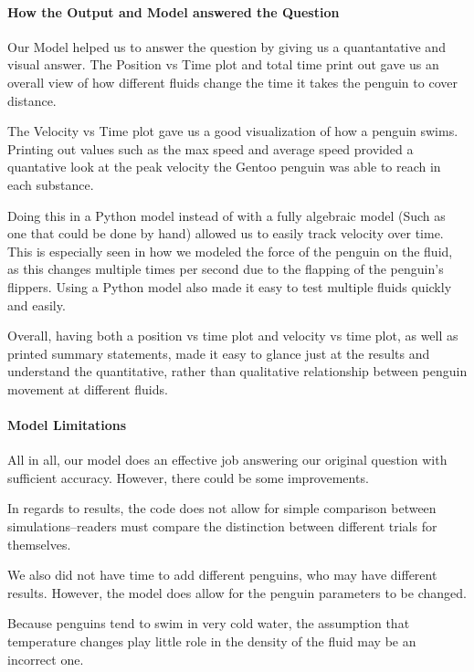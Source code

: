 \documentclass[11pt]{article}
\begin{document}
    \hypertarget{how-the-output-and-model-answered-the-question}{%
\paragraph{How the Output and Model answered the
Question}\label{how-the-output-and-model-answered-the-question}}

Our Model helped us to answer the question by giving us a quantantative
and visual answer. The Position vs Time plot and total time print out
gave us an overall view of how different fluids change the time it takes
the penguin to cover distance.

The Velocity vs Time plot gave us a good visualization of how a penguin
swims. Printing out values such as the max speed and average speed
provided a quantative look at the peak velocity the Gentoo penguin was
able to reach in each substance.

Doing this in a Python model instead of with a fully algebraic model
(Such as one that could be done by hand) allowed us to easily track
velocity over time. This is especially seen in how we modeled the force
of the penguin on the fluid, as this changes multiple times per second
due to the flapping of the penguin's flippers. Using a Python model also
made it easy to test multiple fluids quickly and easily.

Overall, having both a position vs time plot and velocity vs time plot,
as well as printed summary statements, made it easy to glance just at
the results and understand the quantitative, rather than qualitative
relationship between penguin movement at different fluids.

\hypertarget{model-limitations}{%
\paragraph{Model Limitations}\label{model-limitations}}

All in all, our model does an effective job answering our original
question with sufficient accuracy. However, there could be some
improvements.

In regards to results, the code does not allow for simple comparison
between simulations--readers must compare the distinction between
different trials for themselves.

We also did not have time to add different penguins, who may have
different results. However, the model does allow for the penguin
parameters to be changed.

Because penguins tend to swim in very cold water, the assumption that
temperature changes play little role in the density of the fluid may be
an incorrect one.
\end{document}
